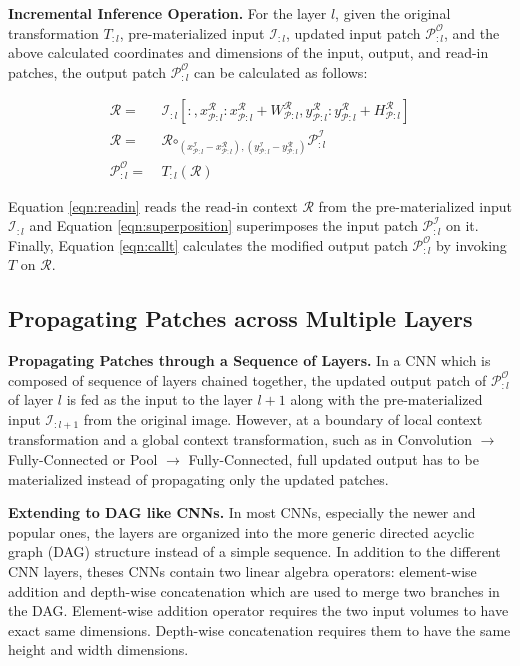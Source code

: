 \vspace{2mm}
\noindent \textbf{Incremental Inference Operation.} For the layer $l$, given the original transformation $T_{:l}$, pre-materialized input $\mathcal{I}_{:l}$, updated input patch $\mathcal{P}^\mathcal{O}_{:l}$, and the above calculated coordinates and dimensions of the input, output, and read-in patches, the output patch $\mathcal{P}^\mathcal{O}_{:l}$ can be calculated as follows:

\begin{align}
\label{eqn:readin}
\mathcal{R} =&~ \mathcal{I}_{:l}[:,x^\mathcal{R}_{\mathcal{P}:l}:x^\mathcal{R}_{\mathcal{P}:l}+W^\mathcal{R}_{\mathcal{P}:l}, y^\mathcal{R}_{\mathcal{P}:l}: y^\mathcal{R}_{\mathcal{P}:l}+ H^\mathcal{R}_{\mathcal{P}:l}]\\
\label{eqn:superposition}
\mathcal{R} =&~ \mathcal{R} \bm\circ_{(x^\mathcal{I}_{\mathcal{P}:l}-x^\mathcal{R}_{\mathcal{P}:l}),(y^\mathcal{I}_{\mathcal{P}:l}-y^\mathcal{R}_{\mathcal{P}:l})} \mathcal{P}^{\mathcal{I}}_{:l}\\
\label{eqn:callt}
\mathcal{P}^\mathcal{O}_{:l} =&~ T_{:l}(\mathcal{R})
\end{align}

Equation \ref{eqn:readin} reads the read-in context $\mathcal{R}$ from the pre-materialized input $\mathcal{I}_{:l}$ and Equation \ref{eqn:superposition} superimposes the input patch $\mathcal{P}^\mathcal{I}_{:l}$ on it.
Finally, Equation \ref{eqn:callt} calculates the modified output patch $\mathcal{P}^{\mathcal{O}}_{:l}$ by invoking $T$ on $\mathcal{R}$.


\subsection{Propagating Patches across Multiple Layers}

\vspace{2mm}
\noindent \textbf{Propagating Patches through a Sequence of Layers.} In a CNN which is composed of sequence of layers chained together, the updated output patch of $\mathcal{P}^{\mathcal{O}}_{:l}$ of layer $l$ is fed as the input to the layer $l+1$ along with the pre-materialized input $\mathcal{I}_{:l+1}$ from the original image.
However, at a boundary of local context transformation and a global context transformation, such as in Convolution $\rightarrow$ Fully-Connected or Pool $\rightarrow$ Fully-Connected, full updated output has to be materialized instead of propagating only the updated patches.

\vspace{2mm}
\noindent \textbf{Extending to DAG like CNNs.} In most CNNs, especially the newer and popular ones, the layers are organized into the more generic directed acyclic graph (DAG) structure instead of a simple sequence.
In addition to the different CNN layers, theses CNNs contain two linear algebra operators: element-wise addition and depth-wise concatenation which are used to merge two branches in the DAG. 
Element-wise addition operator requires the two input volumes to have exact same dimensions.
Depth-wise concatenation requires them to have the same height and width dimensions.

